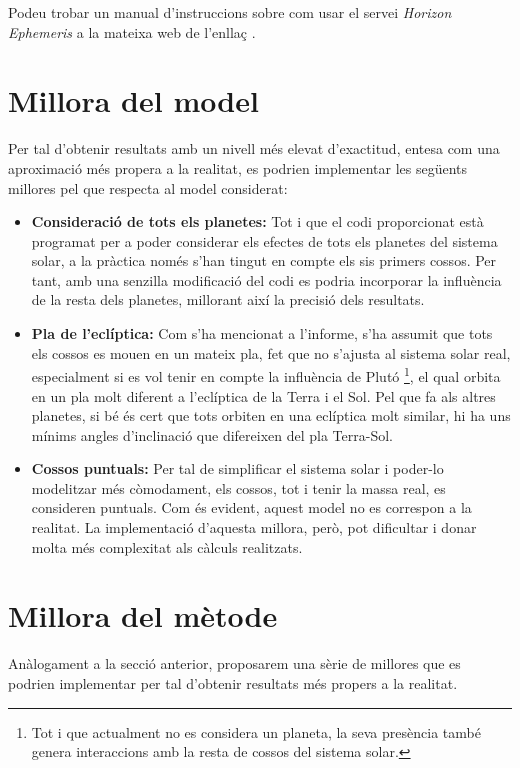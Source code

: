 \documentclass[10pt, twoside, a4paper]{article}
\begin{document}
Podeu trobar un manual d'instruccions sobre com usar el servei \textit{Horizon Ephemeris} a la mateixa web de l'enllaç \cite{ref3}. 

\section{Millora del model}
\label{an:d}
Per tal d'obtenir resultats amb un nivell més elevat d'exactitud, entesa com una aproximació més propera a la realitat, es podrien implementar les següents millores pel que respecta al model considerat:
\begin{itemize}
    \item \textbf{Consideració de tots els planetes: } Tot i que el codi proporcionat està programat per a poder considerar els efectes de tots els planetes del sistema solar, a la pràctica només s'han tingut en compte els sis primers cossos. Per tant, amb una senzilla modificació del codi es podria incorporar la influència de la resta dels planetes, millorant així la precisió dels resultats.
    \item \textbf{Pla de l'eclíptica: } Com s'ha mencionat a l'informe, s'ha assumit que tots els cossos es mouen en un mateix pla, fet que no s'ajusta al sistema solar real, especialment si es vol tenir en compte la influència de Plutó \footnote{Tot i que actualment no es considera un planeta, la seva presència també genera interaccions amb la resta de cossos del sistema solar.}, el qual orbita en un pla molt diferent a l'eclíptica de la Terra i el Sol. Pel que fa als altres planetes, si bé és cert que tots orbiten en una eclíptica molt similar, hi ha uns mínims angles d'inclinació que difereixen del pla Terra-Sol.
    \item \textbf{Cossos puntuals: }Per tal de simplificar el sistema solar i poder-lo modelitzar més còmodament, els cossos, tot i tenir la massa real, es consideren puntuals. Com és evident, aquest model no es correspon a la realitat. La implementació d'aquesta millora, però, pot dificultar i donar molta més complexitat als càlculs realitzats.
\end{itemize}

\section{Millora del mètode}
\label{an:e}
Anàlogament a la secció anterior, proposarem una sèrie de millores que es podrien implementar per tal d'obtenir resultats més propers a la realitat.
\end{document}
